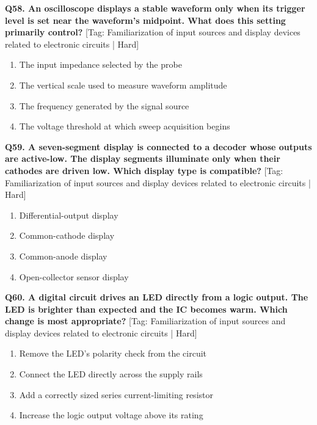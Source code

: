 \noindent\textbf{Q58. An oscilloscope displays a stable waveform only when its trigger level is set near the waveform's midpoint. What does this setting primarily control?} \hfill [Tag: Familiarization of input sources and display devices related to electronic circuits | Hard]
\begin{enumerate}[label=(\alph*),topsep=2pt,itemsep=1pt,partopsep=0pt,parsep=0pt]
    \item {The input impedance selected by the probe}
    \item {The vertical scale used to measure waveform amplitude}
    \item {The frequency generated by the signal source}
    \item {The voltage threshold at which sweep acquisition begins}
\end{enumerate}
\vspace{2mm}

\noindent\textbf{Q59. A seven-segment display is connected to a decoder whose outputs are active-low. The display segments illuminate only when their cathodes are driven low. Which display type is compatible?} \hfill [Tag: Familiarization of input sources and display devices related to electronic circuits | Hard]
\begin{enumerate}[label=(\alph*),topsep=2pt,itemsep=1pt,partopsep=0pt,parsep=0pt]
    \item {Differential-output display}
    \item {Common-cathode display}
    \item {Common-anode display}
    \item {Open-collector sensor display}
\end{enumerate}
\vspace{2mm}

\noindent\textbf{Q60. A digital circuit drives an LED directly from a logic output. The LED is brighter than expected and the IC becomes warm. Which change is most appropriate?} \hfill [Tag: Familiarization of input sources and display devices related to electronic circuits | Hard]
\begin{enumerate}[label=(\alph*),topsep=2pt,itemsep=1pt,partopsep=0pt,parsep=0pt]
    \item {Remove the LED's polarity check from the circuit}
    \item {Connect the LED directly across the supply rails}
    \item {Add a correctly sized series current-limiting resistor}
    \item {Increase the logic output voltage above its rating}
\end{enumerate}
\vspace{2mm}


